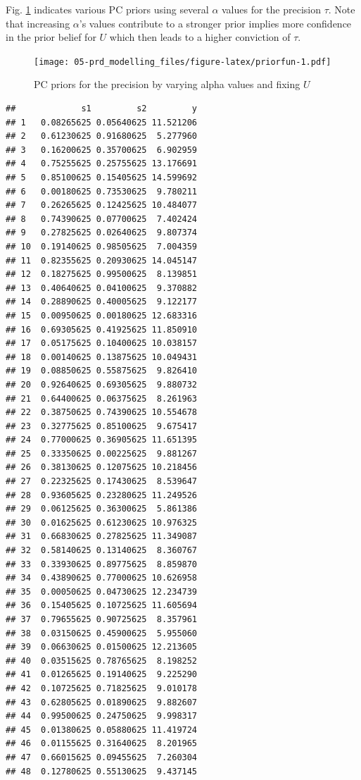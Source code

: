 \documentclass[
  12pt,
  a4paper,
  oneside]{book}
\theoremstyle{definition}
\theoremstyle{definition}
\theoremstyle{definition}
\theoremstyle{remark}
\begin{document}
Fig. \ref{fig:priorfun} indicates various PC priors using several \(\alpha\) values for the precision \(\tau\). Note that increasing \(\alpha\)'s values contribute to a stronger prior implies more confidence in the prior belief for \(U\) which then leads to a higher conviction of \(\tau\).

\begin{figure}
\centering
\texttt{[image: 05-prd\_modelling\_files/figure-latex/priorfun-1.pdf]}
\caption{\label{fig:priorfun}PC priors for the precision by varying alpha values and fixing \(U\)}
\end{figure}

\begin{lstlisting}
##             s1         s2         y
## 1   0.08265625 0.05640625 11.521206
## 2   0.61230625 0.91680625  5.277960
## 3   0.16200625 0.35700625  6.902959
## 4   0.75255625 0.25755625 13.176691
## 5   0.85100625 0.15405625 14.599692
## 6   0.00180625 0.73530625  9.780211
## 7   0.26265625 0.12425625 10.484077
## 8   0.74390625 0.07700625  7.402424
## 9   0.27825625 0.02640625  9.807374
## 10  0.19140625 0.98505625  7.004359
## 11  0.82355625 0.20930625 14.045147
## 12  0.18275625 0.99500625  8.139851
## 13  0.40640625 0.04100625  9.370882
## 14  0.28890625 0.40005625  9.122177
## 15  0.00950625 0.00180625 12.683316
## 16  0.69305625 0.41925625 11.850910
## 17  0.05175625 0.10400625 10.038157
## 18  0.00140625 0.13875625 10.049431
## 19  0.08850625 0.55875625  9.826410
## 20  0.92640625 0.69305625  9.880732
## 21  0.64400625 0.06375625  8.261963
## 22  0.38750625 0.74390625 10.554678
## 23  0.32775625 0.85100625  9.675417
## 24  0.77000625 0.36905625 11.651395
## 25  0.33350625 0.00225625  9.881267
## 26  0.38130625 0.12075625 10.218456
## 27  0.22325625 0.17430625  8.539647
## 28  0.93605625 0.23280625 11.249526
## 29  0.06125625 0.36300625  5.861386
## 30  0.01625625 0.61230625 10.976325
## 31  0.66830625 0.27825625 11.349087
## 32  0.58140625 0.13140625  8.360767
## 33  0.33930625 0.89775625  8.859870
## 34  0.43890625 0.77000625 10.626958
## 35  0.00050625 0.04730625 12.234739
## 36  0.15405625 0.10725625 11.605694
## 37  0.79655625 0.90725625  8.357961
## 38  0.03150625 0.45900625  5.955060
## 39  0.06630625 0.01500625 12.213605
## 40  0.03515625 0.78765625  8.198252
## 41  0.01265625 0.19140625  9.225290
## 42  0.10725625 0.71825625  9.010178
## 43  0.62805625 0.01890625  9.882607
## 44  0.99500625 0.24750625  9.998317
## 45  0.01380625 0.05880625 11.419724
## 46  0.01155625 0.31640625  8.201965
## 47  0.66015625 0.09455625  7.260304
## 48  0.12780625 0.55130625  9.437145

\end{lstlisting}
\end{document}

